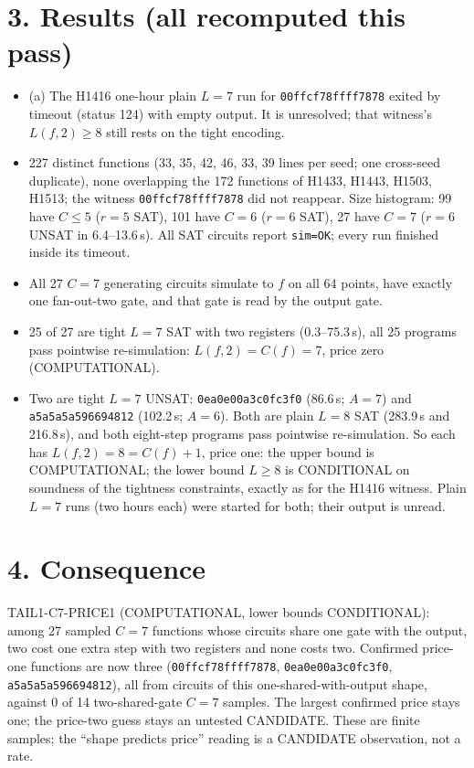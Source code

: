 \documentclass[11pt]{article}
\begin{document}
\section*{3. Results (all recomputed this pass)}
\begin{itemize}
\item (a) The H1416 one-hour plain $L=7$ run for \texttt{00ffcf78ffff7878} exited by timeout (status 124) with empty output. It is unresolved; that witness's $L(f,2)\ge8$ still rests on the tight encoding.
\item 227 distinct functions (33, 35, 42, 46, 33, 39 lines per seed; one cross-seed duplicate), none overlapping the 172 functions of H1433, H1443, H1503, H1513; the witness \texttt{00ffcf78ffff7878} did not reappear. Size histogram: 99 have $C\le5$ ($r=5$ SAT), 101 have $C=6$ ($r=6$ SAT), 27 have $C=7$ ($r=6$ UNSAT in 6.4--13.6\,s). All SAT circuits report \texttt{sim=OK}; every run finished inside its timeout.
\item All 27 $C=7$ generating circuits simulate to $f$ on all 64 points, have exactly one fan-out-two gate, and that gate is read by the output gate.
\item 25 of 27 are tight $L=7$ SAT with two registers (0.3--75.3\,s), all 25 programs pass pointwise re-simulation: $L(f,2)=C(f)=7$, price zero (COMPUTATIONAL).
\item Two are tight $L=7$ UNSAT: \texttt{0ea0e00a3c0fc3f0} (86.6\,s; $A=7$) and \texttt{a5a5a5a596694812} (102.2\,s; $A=6$). Both are plain $L=8$ SAT (283.9\,s and 216.8\,s), and both eight-step programs pass pointwise re-simulation. So each has $L(f,2)=8=C(f)+1$, price one: the upper bound is COMPUTATIONAL; the lower bound $L\ge8$ is CONDITIONAL on soundness of the tightness constraints, exactly as for the H1416 witness. Plain $L=7$ runs (two hours each) were started for both; their output is unread.
\end{itemize}

\section*{4. Consequence}
TAIL1-C7-PRICE1 (COMPUTATIONAL, lower bounds CONDITIONAL): among 27 sampled $C=7$ functions whose circuits share one gate with the output, two cost one extra step with two registers and none costs two. Confirmed price-one functions are now three (\texttt{00ffcf78ffff7878}, \texttt{0ea0e00a3c0fc3f0}, \texttt{a5a5a5a596694812}), all from circuits of this one-shared-with-output shape, against 0 of 14 two-shared-gate $C=7$ samples. The largest confirmed price stays one; the price-two guess stays an untested CANDIDATE. These are finite samples; the ``shape predicts price'' reading is a CANDIDATE observation, not a rate.
\end{document}
